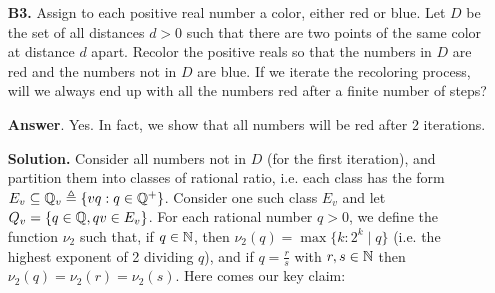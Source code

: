 \documentclass[11pt,a4paper]{article}
\begin{document}
\begin{enumerate}
\begin{proof}
	    	  Now consider $u$ to be the shortest nonzero vector in $S$. 
	    	  Suppose $|u| < 1$. 
	    	  Let $u  = s\times t, s, t\in S$ for some $s, t$. 
	    	  Let $r = u\times s$. Then $u, s, r$ are mutually perpendicular to each other and are nonzero. 
	    	  In addition, $|s|\le 1$ so $|r|\le |u|$. 
	    	  Since $|r\times u|=|r|\cdot |u|=|u|^2 < |u|$ and $r\times u\neq 0$, 
	    	  this contradicts the minimality of $|u|$ among the nonzero vectors. 
	    	  
	    	  Finally, now that all nonzero vectors are unit, 
	    	  let $s, t\in S$ with $|s| = |t| = 1$. 
	    	  Then $|s\times t|$ is either 0 or 1, 
	    	  showing that $s$ and $t$ are either parallel or perpendicular to each other. 
	    \end{proof}
        
        Now if $S$ is nonempty, then $v\in S$ means $0=v\times v\in S$.
        In addition, $v\times w=-w\times v$, 
        and therefore $s\in S\to -S\in S$. 
        If $n > 1$, 
        then we can pick $s\in S$ that's nonzero, 
        and therefore 
        $s=t\times u$ for some $t, u\in S$. 
        From our lemma, $s, t, u$ are all unit and are mutually perpendicular to each other. 
        We also have $-s, -t, -u\in S$ since $S$ is closed under negation. 
        Together with $0\in S$ we have $|S|\ge 7$. 
        Since a 3D space cannot admit more than 3 mutually perpendicular vectors (up to scalar constants), 
        these 7 vectors are all the elements in $S$. 
		
		\item [\textbf{B3.}]
		Assign to each positive real number a color, either red or blue. Let $D$ be the set of all distances $d>0$ such that there are two points of the same color at distance $d$ apart. Recolor the positive reals so that the numbers in $D$ are red and the numbers not in $D$ are blue. If we iterate the recoloring process, will we always end up with all the numbers red after a finite number of steps?
		
		\textbf{Answer}. 
		Yes. In fact, we show that all numbers will be red after 2 iterations. 
		
		\textbf{Solution.} 
		Consider all numbers not in $D$ (for the first iteration), and partition them into classes of rational ratio, 
		i.e. each class has the form $E_v \subseteq {\mathbb Q}_v\triangleq \{vq: q\in {\mathbb Q}^+\}$. 
		Consider one such class $E_v$ and let $Q_v = \{q\in{\mathbb Q}, qv\in E_v\}$. 
		For each rational number $q>0$, we define the function $\nu_2$ such that, 
		if $q\in{\mathbb N}$, then $\nu_2(q)=\max\{k: 2^k\mid q\}$ (i.e. the highest exponent of 2 dividing $q$), 
		and if $q=\frac{r}{s}$ with $r, s\in{\mathbb N}$ then $\nu_2(q)=\nu_2(r)=\nu_2(s)$. 
		Here comes our key claim: 
		

\end{enumerate}
\end{document}
